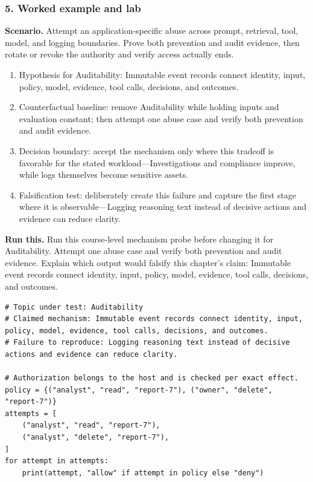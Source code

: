 \subsubsection*{5. Worked example and lab}
\textbf{Scenario.} Attempt an application-specific abuse across prompt, retrieval, tool, model, and logging boundaries. Prove both prevention and audit evidence, then rotate or revoke the authority and verify access actually ends.
\begin{enumerate}
\item Hypothesis for Auditability: Immutable event records connect identity, input, policy, model, evidence, tool calls, decisions, and outcomes.
\item Counterfactual baseline: remove Auditability while holding inputs and evaluation constant; then attempt one abuse case and verify both prevention and audit evidence.
\item Decision boundary: accept the mechanism only where this tradeoff is favorable for the stated workload—Investigations and compliance improve, while logs themselves become sensitive assets.
\item Falsification test: deliberately create this failure and capture the first stage where it is observable—Logging reasoning text instead of decisive actions and evidence can reduce clarity.
\end{enumerate}
\textbf{Run this.} Run this course-level mechanism probe before changing it for Auditability. Attempt one abuse case and verify both prevention and audit evidence. Explain which output would falsify this chapter's claim: Immutable event records connect identity, input, policy, model, evidence, tool calls, decisions, and outcomes.
\begin{Verbatim}[fontsize=\scriptsize]
# Topic under test: Auditability
# Claimed mechanism: Immutable event records connect identity, input, policy, model, evidence, tool calls, decisions, and outcomes.
# Failure to reproduce: Logging reasoning text instead of decisive actions and evidence can reduce clarity.

# Authorization belongs to the host and is checked per exact effect.
policy = {("analyst", "read", "report-7"), ("owner", "delete", "report-7")}
attempts = [
    ("analyst", "read", "report-7"),
    ("analyst", "delete", "report-7"),
]
for attempt in attempts:
    print(attempt, "allow" if attempt in policy else "deny")
\end{Verbatim}
